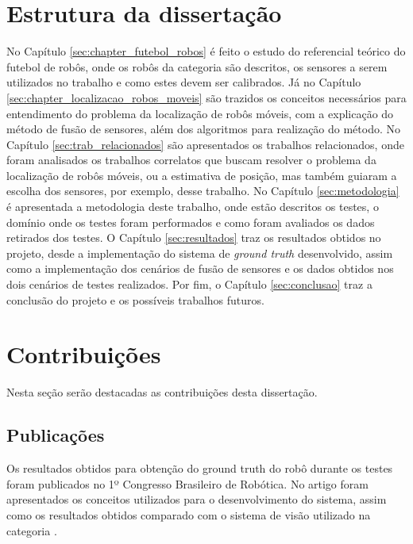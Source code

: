 \documentclass[acronym, symbols, table]{fei}
\begin{document}
	\section{Estrutura da dissertação}
	
		No Capítulo \ref{sec:chapter_futebol_robos} é feito o estudo do referencial teórico do futebol de robôs, onde os robôs da categoria  são descritos, os sensores a serem utilizados no trabalho e como estes devem ser calibrados. Já no Capítulo \ref{sec:chapter_localizacao_robos_moveis} são trazidos os conceitos necessários para entendimento do problema da localização de robôs móveis, com a explicação do método de fusão de sensores, além dos algoritmos para realização do método. No Capítulo \ref{sec:trab_relacionados} são apresentados os trabalhos relacionados, onde foram analisados os trabalhos correlatos que buscam resolver o problema da localização de robôs móveis, ou a estimativa de posição, mas também guiaram a escolha dos sensores, por exemplo, desse trabalho. No Capítulo \ref{sec:metodologia} é apresentada a metodologia deste trabalho, onde estão descritos os testes, o domínio onde os testes foram performados e como foram avaliados os dados retirados dos testes. O Capítulo \ref{sec:resultados} traz os resultados obtidos no projeto, desde a implementação do sistema de \textit{ground truth} desenvolvido, assim como a implementação dos cenários de fusão de sensores e os dados obtidos nos dois cenários de testes realizados. Por fim, o Capítulo \ref{sec:conclusao} traz a conclusão do projeto e os possíveis trabalhos futuros. %
		
	\section{Contribuições}
	
		Nesta seção serão destacadas as contribuições desta dissertação.
		
		\subsection{Publicações}
		
			Os resultados obtidos para obtenção do ground truth do robô durante os testes foram publicados no 1º Congresso Brasileiro de Robótica. No artigo foram apresentados os conceitos utilizados para o desenvolvimento do sistema, assim como os resultados obtidos comparado com o sistema de visão utilizado na categoria .
			
\end{document}
